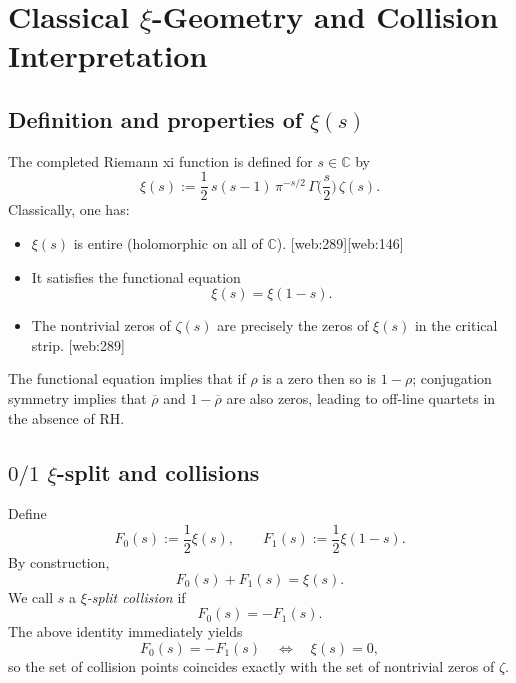 \documentclass[11pt]{article}
\begin{document}
\section{Classical $\xi$-Geometry and Collision Interpretation}

\subsection{Definition and properties of $\xi(s)$}

The completed Riemann xi function is defined for $s\in\mathbb{C}$ by
\begin{equation}
  \xi(s) := \frac12\, s(s-1)\,\pi^{-s/2}\,\Gamma\!\Big(\frac{s}{2}\Big)\,\zeta(s).
\end{equation}
Classically, one has:
\begin{itemize}
  \item $\xi(s)$ is entire (holomorphic on all of $\mathbb{C}$). [web:289][web:146]
  \item It satisfies the functional equation
  \[
    \xi(s) = \xi(1-s).
  \]
  \item The nontrivial zeros of $\zeta(s)$ are precisely the zeros of $\xi(s)$ in the critical strip. [web:289]
\end{itemize}

The functional equation implies that if $\rho$ is a zero then so is $1-\rho$; conjugation symmetry implies that $\overline{\rho}$ and $1-\overline{\rho}$ are also zeros, leading to off-line quartets in the absence of RH.

\subsection{$0/1$ $\xi$-split and collisions}

Define
\begin{equation}
  F_0(s) := \frac12\xi(s), \qquad
  F_1(s) := \frac12\xi(1-s).
\end{equation}
By construction,
\begin{equation}
  F_0(s) + F_1(s) = \xi(s).
\end{equation}
We call $s$ a \emph{$\xi$-split collision} if
\begin{equation}
  F_0(s) = -F_1(s).
\end{equation}
The above identity immediately yields
\begin{equation}
  F_0(s)=-F_1(s)\quad\Longleftrightarrow\quad \xi(s)=0,
\end{equation}
so the set of collision points coincides exactly with the set of nontrivial zeros of $\zeta$.
\end{document}
